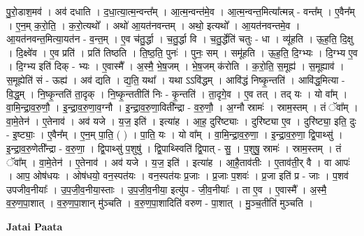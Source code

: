 \documentclass[17pt]{extarticle}
\begin{document}
पु॒रो॒डाश॒मव॑ । अव॑ दधाति । द॒धा॒त्या॒त्म॒न्वन्त᳚म् । आ॒त्म॒न्वन्त॑मे॒व । आ॒त्म॒न्वन्त॒मित्या᳚त्मन्न् - वन्त᳚म् । ए॒वैन᳚म् । ए॒न॒म् क॒रो॒ति॒ । क॒रो॒त्यथो᳚ । अथो॑ आ॒यत॑नवन्तम् । अथो॒ इत्यथो᳚ । आ॒यत॑नवन्तमे॒व । आ॒यत॑नवन्त॒मित्या॒यत॑न - व॒न्त॒म् । ए॒व च॑तु॒र्द्धा । च॒तु॒र्द्धा वि । च॒तु॒र्द्धेति॑ चतुः - धा । व्यू॑हति । ऊ॒ह॒ति॒ दि॒क्षु । दि॒क्ष्वे॑व । ए॒व प्रति॑ । प्रति॑ तिष्ठति । ति॒ष्ठ॒ति॒ पुनः॑ । पुनः॒ सम् । समू॑हति । ऊ॒ह॒ति॒ दि॒ग्भ्यः । दि॒ग्भ्य ए॒व । दि॒ग्भ्य इति॑ दिक् - भ्यः । ए॒वास्मै᳚ । अ॒स्मै॒ भे॒ष॒जम् । भे॒ष॒जम् क॑रोति । क॒रो॒ति॒ स॒मूह्य॑ । स॒मूह्याव॑ । स॒मूह्येति॑ सं - ऊह्य॑ । अव॑ द्यति । द्य॒ति॒ यथा᳚ । यथा ऽऽवि॑द्धम् । आवि॑द्धं निष्कृ॒न्तति॑ । आवि॑द्ध॒मित्या - वि॒द्ध॒म् । नि॒ष्कृ॒न्तति॑ ता॒दृक् । नि॒ष्कृ॒न्ततीति॑ निः - कृ॒न्तति॑ । ता॒दृगे॒व । ए॒व तत् । तद् यः । यो वा᳚म् । वा॒मि॒न्द्रा॒व॒रु॒णौ॒ । इ॒न्द्रा॒व॒रु॒णा॒व॒ग्नौ । इ॒न्द्रा॒व॒रु॒णा॒विती᳚न्द्रा - व॒रु॒णौ॒ । अ॒ग्नौ स्रामः॑ । स्राम॒स्तम् । तं ॅवा᳚म् । वा॒मे॒तेन॑ । ए॒तेनाव॑ । अव॑ यजे । य॒ज॒ इति॑ । इत्या॑ह । आ॒ह॒ दुरि॑ष्ट्याः । दुरि॑ष्ट्या ए॒व । दुरि॑ष्ट्या॒ इति॒ दुः - इ॒ष्ट्याः॒ । ए॒वैन᳚म् । ए॒न॒म् पा॒ति॒ ( ) । पा॒ति॒ यः । यो वा᳚म् । वा॒मि॒न्द्रा॒व॒रु॒णा॒ । इ॒न्द्रा॒व॒रु॒णा॒ द्वि॒पाथ्सु॑ । इ॒न्द्रा॒व॒रु॒णेती᳚न्द्रा - व॒रु॒णा॒ । द्वि॒पाथ्सु॑ प॒शुषु॑ । द्वि॒पाथ्स्विति॑ द्वि॒पात् - सु॒ । प॒शुषु॒ स्रामः॑ । स्राम॒स्तम् । तं ॅवा᳚म् । वा॒मे॒तेन॑ । ए॒तेनाव॑ । अव॑ यजे । य॒ज॒ इति॑ । इत्या॑ह । आ॒है॒ताव॑तीः । ए॒ताव॑ती॒र् वै । वा आपः॑ । आप॒ ओष॑धयः । ओष॑धयो॒ वन॒स्पत॑यः । वन॒स्पत॑यः प्र॒जाः । प्र॒जाः प॒शवः॑ । प्र॒जा इति॑ प्र - जाः । प॒शव॑ उपजीव॒नीयाः᳚ । उ॒प॒जी॒व॒नीया॒स्ताः । उ॒प॒जी॒व॒नीया॒ इत्यु॑प - जी॒व॒नीयाः᳚ । ता ए॒व । ए॒वास्मै᳚ । अ॒स्मै॒ व॒रु॒ण॒पा॒शात् । व॒रु॒ण॒पा॒शान् मु॑ञ्चति । व॒रु॒ण॒पा॒शादिति॑ वरुण - पा॒शात् । मु॒ञ्च॒तीति॑ मुञ्चति । \newline

\textbf{Jatai Paata} \newline
\end{document}
